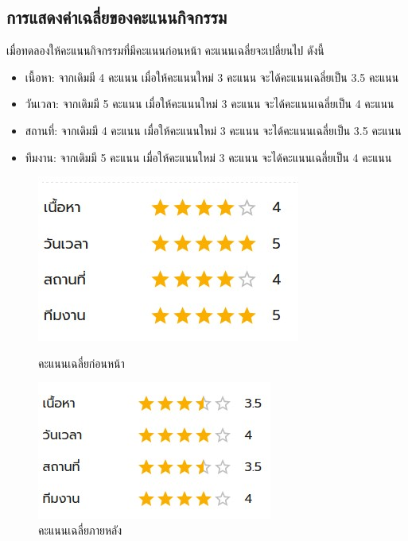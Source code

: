 \subsection{การแสดงค่าเฉลี่ยของคะแนนกิจกรรม}
เมื่อทดลองให้คะแนนกิจกรรมที่มีคะแนนก่อนหน้า คะแนนเฉลี่ยจะเปลี่ยนไป ดังนี้
\begin{itemize}
    \item เนื้อหา: จากเดิมมี 4 คะแนน เมื่อให้คะแนนใหม่ 3 คะแนน จะได้คะแนนเฉลี่ยเป็น 3.5 คะแนน
    \item วันเวลา: จากเดิมมี 5 คะแนน เมื่อให้คะแนนใหม่ 3 คะแนน จะได้คะแนนเฉลี่ยเป็น 4 คะแนน
    \item สถานที่: จากเดิมมี 4 คะแนน เมื่อให้คะแนนใหม่ 3 คะแนน จะได้คะแนนเฉลี่ยเป็น 3.5 คะแนน
    \item ทีมงาน: จากเดิมมี 5 คะแนน เมื่อให้คะแนนใหม่ 3 คะแนน จะได้คะแนนเฉลี่ยเป็น 4 คะแนน
\end{itemize}
\begin{figure}[H]
    \begin{minipage}[b]{0.48\textwidth}
        \includegraphics[width=\textwidth,keepaspectratio]{public/after-score-1st.jpg}
        \caption[ผลทดลองคะแนนเฉลี่ยก่อนหน้า]{คะแนนเฉลี่ยก่อนหน้า}
    \end{minipage}
    \hfill
    \begin{minipage}[b]{0.48\textwidth}
        \includegraphics[width=\textwidth,keepaspectratio]{public/after-score-2nd.jpg}
        \caption[ผลทดลองคะแนนเฉลี่ยภายหลัง]{คะแนนเฉลี่ยภายหลัง}
    \end{minipage}
\end{figure}
